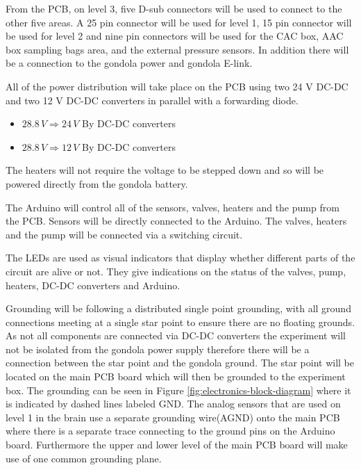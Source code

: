 \documentclass[a4paper,12pt,twoside]{article}
\begin{document}
From the PCB, on level 3, five D-sub connectors will be used to connect to the other five areas. A 25 pin connector will be used for level 1, 15 pin connector will be used for level 2 and nine pin connectors will be used for the CAC box, AAC box sampling bags area, and the external pressure sensors. In addition there will be a connection to the gondola power and gondola E-link.

All of the power distribution will take place on the PCB using two 24 V DC-DC and two 12 V DC-DC converters in parallel with a forwarding diode.  
\begin{itemize}
  \item $28.8 \, V \Longrightarrow 24 \, V $ By DC-DC converters
  \item $28.8 \, V \Longrightarrow 12 \, V$ By DC-DC converters
  \end{itemize}
The heaters will not require the voltage to be stepped down and so will be powered directly from the gondola battery.

The Arduino will control all of the sensors, valves, heaters and the pump from the PCB. Sensors will be directly connected to the Arduino. The valves, heaters and the pump will be connected via a switching circuit.

The LEDs are used as visual indicators that display whether different parts of the circuit are alive or not. They give indications on the status of the valves, pump, heaters, DC-DC converters and Arduino. 

Grounding will be following a distributed single point grounding, with all ground connections meeting at a single star point to ensure there are no floating grounds. As not all components are connected via DC-DC converters the experiment will not be isolated from the gondola power supply therefore there will be a connection between the star point and the gondola ground. The star point will be located on the main PCB board which will then be grounded to the experiment box. The grounding can be seen in Figure \ref{fig:electronics-block-diagram} where it is indicated by dashed lines labeled GND. The analog sensors that are used on level 1 in the brain use a separate grounding wire(AGND) onto the main PCB where there is a separate trace connecting to the ground pins on the Arduino board. Furthermore the upper and lower level of the main PCB board will make use of one common grounding plane.
\end{document}

